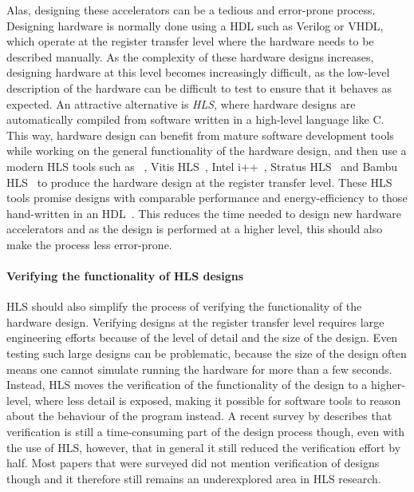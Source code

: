 Alas, designing these accelerators can be a tedious and error-prone process.
Designing hardware is normally done using a \gls{HDL} such as Verilog or VHDL,
which operate at the register transfer level where the hardware needs to be
described manually.  As the complexity of these hardware designs increases,
designing hardware at this level becomes increasingly difficult, as the
low-level description of the hardware can be difficult to test to ensure that it
behaves as expected.  An attractive alternative is \emph{\gls{HLS}}, where
hardware designs are automatically compiled from software written in a
high-level language like C.  This way, hardware design can benefit from mature
software development tools while working on the general functionality of the
hardware design, and then use a modern \gls{HLS} tools such as
\legup{}~\cite{canis13_l}, Vitis HLS~\cite{amd23_vitis_high_synth}, Intel
i++~\cite{intel20_hsc}, Stratus HLS~\cite{roane23_autom_hw_sw_co_desig} and
Bambu HLS~\cite{pilato13_bambu} to produce the hardware design at the register
transfer level.  These \gls{HLS} tools promise designs with comparable
performance and energy-efficiency to those hand-written in an
\gls{HDL}~\cite{homsirikamol14_can, gauthier20_high_level_synth,
  pelcat16_desig_hdl}.  This reduces the time needed to design new hardware
accelerators and as the design is performed at a higher level, this should also
make the process less error-prone.

\paragraph{Verifying the functionality of HLS designs} \Gls{HLS} should also
simplify the process of verifying the functionality of the hardware design.
Verifying designs at the register transfer level requires large engineering
efforts because of the level of detail and the size of the design.  Even testing
such large designs can be problematic, because the size of the design often
means one cannot simulate running the hardware for more than a few seconds.
Instead, \gls{HLS} moves the verification of the functionality of the design to
a higher-level, where less detail is exposed, making it possible for software
tools to reason about the behaviour of the program instead. A recent survey by
\textcite{lahti19_are_we_there_yet} describes that verification is still a
time-consuming part of the design process though, even with the use of
\gls{HLS}, however, that in general it still reduced the verification effort by
half.  Most papers that were surveyed did not mention verification of designs
though and it therefore still remains an underexplored area in \gls{HLS}
research.

